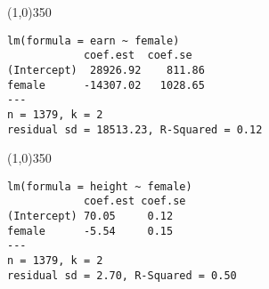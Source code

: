 \documentclass[addpoints,12pt]{exam}
\begin{document}
\begin{questions}
\begin{parts}
\end{parts}
\end{questions}

\newpage
\thispagestyle{empty}
\small


\noindent\line(1,0){350}
\begin{verbatim}
lm(formula = earn ~ female)
            coef.est  coef.se  
(Intercept)  28926.92    811.86
female      -14307.02   1028.65
---
n = 1379, k = 2
residual sd = 18513.23, R-Squared = 0.12
\end{verbatim}

\noindent\line(1,0){350}

\begin{verbatim}
lm(formula = height ~ female)
            coef.est coef.se
(Intercept) 70.05     0.12  
female      -5.54     0.15  
---
n = 1379, k = 2
residual sd = 2.70, R-Squared = 0.50
\end{verbatim}
\end{document}
